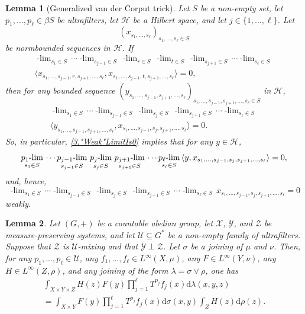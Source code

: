 \documentclass[10pt,a4paper]{amsart}
\newtheorem{lemma}{Lemma}
\newcommand{\plimgG}[3]{\mathop {#1\text{-lim}}_{#2\in #3}\,}
\begin{document}
\begin{lemma} [Generalized van der Corput trick] \label{3.GeneralVdC}
 Let $S$ be a non-empty set, let $p_1,...,p_\ell\in\beta S$ be ultrafilters, let  $\mathcal H$ be a Hilbert space, and let $j\in\{1,...,\ell\}$. Let
 $$(x_{s_1,...,s_\ell})_{s_1,...,s_\ell\in S}$$
 be norm\text{-}bounded  sequences in $\mathcal H$.
If 
\begin{multline}\label{3.LimitIs0}
\plimgG{p_1}{s_1}{S}\cdots\plimgG{p_{j-1}}{s_{j-1}}{S}\plimgG{p_{j}}{r}{S}\plimgG{p_{j}}{t}{S}\plimgG{p_{j+1}}{s_{j+1}}{S}\cdots\plimgG{p_{\ell}}{s_{\ell}}{S}\\
\langle x_{s_1,...,s_{j-1},r,s_{j+1},...,s_\ell},x_{s_1,...,s_{j-1},t,s_{j+1},...,s_\ell}\rangle=0,
\end{multline}
then for any bounded sequence $(y_{s_1,...,s_{j-1},s_{j+1},...,s_\ell})_{s_1,...,s_{j-1},s_{j+1},...,s_\ell\in S}$ in $\mathcal H$, 
\begin{multline}\label{3."Weak"LimitIs0}
\plimgG{p_1}{s_1}{S}\cdots\plimgG{p_{j-1}}{s_{j-1}}{S}\plimgG{p_{j}}{s_{j}}{S}\plimgG{p_{j+1}}{s_{j+1}}{S}\cdots\plimgG{p_{\ell}}{s_{\ell}}{S}\\
\langle y_{s_1,...,s_{j-1},s_{j+1},...,s_\ell},x_{s_1,...,s_{j-1},s_{j},s_{j+1},...,s_\ell}\rangle=0.
\end{multline}
So, in particular,  \eqref{3."Weak"LimitIs0} implies that for any $y\in \mathcal H$,
$$\plimgG{p_1}{s_1}{S}\cdots\plimgG{p_{j-1}}{s_{j-1}}{S}\plimgG{p_{j}}{s_{j}}{S}\plimgG{p_{j+1}}{s_{j+1}}{S}\cdots\plimgG{p_{\ell}}{s_{\ell}}{S}\\
\langle y, x_{s_1,...,s_{j-1},s_{j},s_{j+1},...,s_\ell}\rangle =0,$$
and, hence, 
$$\plimgG{p_1}{s_1}{S}\cdots\plimgG{p_{j-1}}{s_{j-1}}{S}\plimgG{p_{j}}{s_{j}}{S}\plimgG{p_{j+1}}{s_{j+1}}{S}\cdots\plimgG{p_{\ell}}{s_{\ell}}{S}
 x_{s_1,...,s_{j-1},s_{j},s_{j+1},...,s_\ell}=0$$
 weakly. 
\end{lemma}

\begin{lemma}\label{lem:IndependentJoiningsViaVdC}
Let $(G,+)$ be a countable abelian group, let $\mathcal X$, $\mathcal Y$, and $\mathcal Z$ be measure-preserving systems, and let $\mathcal U\subseteq G^*$ be a non-empty family of  ultrafilters. Suppose that $\mathcal Z$ is $\mathcal U$-mixing and that $\mathcal Y\perp \mathcal Z$. Let $\sigma$ be a joining of $\mu$ and $\nu$.
Then, for any $p_1,...,p_\ell\in \mathcal U$,  any $f_1,...,f_\ell\in L^\infty(X,\mu)$, any $F\in L^\infty(Y,\nu)$,   any $H\in L^{\infty}(Z,\rho)$, and any joining of the form $\lambda=\sigma\lor \rho$, one has 
\begin{multline}\label{eq:IndependentJoiningVdC}
\int_{X\times Y\times Z}H(z)F(y)\prod_{j=1}^\ell T^{p_j}f_j(x)\text{d}\lambda(x,y,z)\\
=\int_{X\times Y} F(y) \prod_{j=1}^\ell T^{p_j}f_j(x)\text{d}\sigma(x,y)\int_Z H(z)\text{d}\rho(z).
\end{multline}
\end{lemma}
\end{document}
